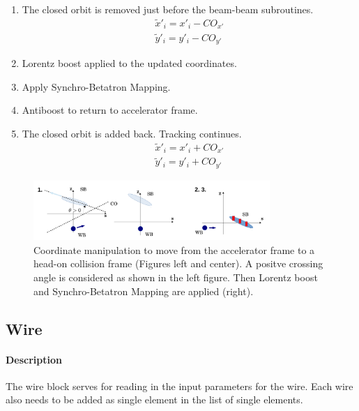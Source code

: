 \begin{itemize}
 \begin{enumerate}
  \item The closed orbit is removed just before the beam-beam subroutines.
  \begin{eqnarray*}
   \tilde x'_i=x'_i-CO_{x'} \\
   \tilde y'_i=y'_i-CO_{y'}
  \end{eqnarray*}
  \item Lorentz boost applied to the updated coordinates.
  \item Apply Synchro-Betatron Mapping.
  \item Antiboost to return to accelerator frame.
  \item The closed orbit is added back. Tracking continues.
  \begin{eqnarray*}
   \tilde x'_i=x'_i+CO_{x'} \\
   \tilde y'_i=y'_i+CO_{y'}
  \end{eqnarray*}
 \end{enumerate}
 \begin{figure}[h]
 \begin{center}
 \includegraphics[width=0.8\textwidth]{figures/BB_xsing}
 \caption{Coordinate manipulation to move from the accelerator frame to a head-on collision frame (Figures left and center). A positve crossing angle is considered as shown in the left figure.
 Then Lorentz boost and Synchro-Betatron Mapping are applied (right).}
 \label{fig:BB_xsing}
 \end{center}
\end{figure}
\end{itemize}

\subsection{Wire} \label{sec:WIRE}

\paragraph{Description} The wire block serves for reading in the input parameters for the wire. Each wire also needs to be added as single element in the list of single elements.

